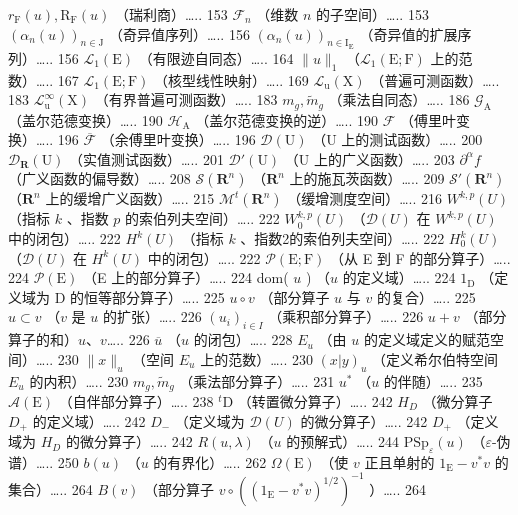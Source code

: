 \(r_{\mathrm{F}}(u), \mathrm{R}_{\mathrm{F}}(u)\) （瑞利商）\ldots.. 153 \(\mathcal{F}_n\) （维数 \(n\) 的子空间）\ldots.. 153 \((\alpha_n(u))_{n \in \mathrm{J}}\) （奇异值序列）\ldots.. 156 \((\alpha_n(u))_{n \in \mathrm{I_E}}\) （奇异值的扩展序列）\ldots.. 156 \(\mathcal{L}_1(\mathrm{E})\) （有限迹自同态）\ldots.. 164 \(\|u\|_1\) （\(\mathcal{L}_1(\mathrm{E};\mathrm{F})\) 上的范数）\ldots.. 167 \(\mathcal{L}_1(\mathrm{E};\mathrm{F})\) （核型线性映射）\ldots.. 169 \(\mathcal{L}_{\mathrm{u}}(\mathrm{X})\) （普遍可测函数）\ldots.. 183 \(\mathcal{L}_{\mathrm{u}}^{\infty}(\mathrm{X})\) （有界普遍可测函数）\ldots.. 183 \(m_g, \widetilde{m}_g\) （乘法自同态）\ldots.. 186 \(\mathcal{G}_{\mathrm{A}}\) （盖尔范德变换）\ldots.. 190 \(\mathcal{H}_{\mathrm{A}}\) （盖尔范德变换的逆）\ldots.. 190 \(\mathcal{F}\) （傅里叶变换）\ldots.. 196 \(\overline{\mathcal{F}}\) （余傅里叶变换）\ldots.. 196 \(\mathcal{D}(\mathrm{U})\) （U 上的测试函数）\ldots.. 200 \(\mathcal{D}_{\mathbf{R}}(\mathrm{U})\) （实值测试函数）\ldots.. 201 \(\mathcal{D}'(\mathrm{U})\) （U 上的广义函数）\ldots.. 203 \(\partial^\alpha f\) （广义函数的偏导数）\ldots.. 208 \(\mathcal{S}(\mathbf{R}^n)\) （\(\mathbf{R}^n\) 上的施瓦茨函数）\ldots.. 209 \(\mathcal{S}'(\mathbf{R}^n)\) （\(\mathbf{R}^n\) 上的缓增广义函数）\ldots.. 215 \(\mathcal{M}^t(\mathbf{R}^n)\) （缓增测度空间）\ldots.. 216 \(W^{k,p}(U)\) （指标 \(k\) 、指数 \(p\) 的索伯列夫空间）\ldots.. 222 \(W_0^{k,p}(U)\) （\(\mathcal{D}(U)\) 在 \(W^{k,p}(U)\) 中的闭包）\ldots.. 222 \(H^k(U)\) （指标 \(k\) 、指数2的索伯列夫空间）\ldots.. 222 \(H_0^k(U)\) （\(\mathcal{D}(U)\) 在 \(H^k(U)\) 中的闭包）\ldots.. 222 \(\mathcal{P}(\mathrm{E};\mathrm{F})\) （从 E 到 F 的部分算子）\ldots.. 224 \(\mathcal{P}(\mathrm{E})\) （E 上的部分算子）\ldots.. 224 dom( \(u\) ) （\(u\) 的定义域）\ldots.. 224 \(1_{\mathrm{D}}\) （定义域为 D 的恒等部分算子）\ldots.. 225 \(u \circ v\) （部分算子 \(u\) 与 \(v\) 的复合）\ldots.. 225 \(u \subset v\) （\(v\) 是 \(u\) 的扩张）\ldots.. 226 \((u_i)_{i \in I}\) （乘积部分算子）\ldots.. 226 \(u + v\) （部分算子的和）\(u\)、\(v\)\ldots.. 226 \(\overline{u}\) （\(u\) 的闭包）\ldots.. 228 \(E_u\) （由 \(u\) 的定义域定义的赋范空间）\ldots.. 230 \(\|x\|_u\) （空间 \(E_u\) 上的范数）\ldots.. 230 \((x | y)_u\) （定义希尔伯特空间 \(E_u\) 的内积）\ldots.. 230 \(m_g, \widetilde{m}_g\) （乘法部分算子）\ldots.. 231 \(u^*\) （\(u\) 的伴随）\ldots.. 235 \(\mathcal{A}(\mathrm{E})\) （自伴部分算子）\ldots.. 238 \(^t\mathrm{D}\) （转置微分算子）\ldots.. 242 \(H_D\) （微分算子 \(D_+\) 的定义域）\ldots.. 242 \(D_-\) （定义域为 \(\mathcal{D}(U)\) 的微分算子）\ldots.. 242 \(D_+\) （定义域为 \(H_D\) 的微分算子）\ldots.. 242 \(R(u,\lambda)\) （\(u\) 的预解式）\ldots.. 244 \(\mathrm{PSp}_{\varepsilon}(u)\) （\(\varepsilon\)-伪谱）\ldots.. 250 \(b(u)\) （\(u\) 的有界化）\ldots.. 262 \(\Omega(\mathrm{E})\) （使 \(v\) 正且单射的 \(1_{\mathrm{E}} - v^*v\) 的集合）\ldots.. 264 \(B(v)\) （部分算子 \(v\circ((1_{\mathrm{E}} - v^*v)^{1/2})^{-1}\) ）\ldots.. 264

